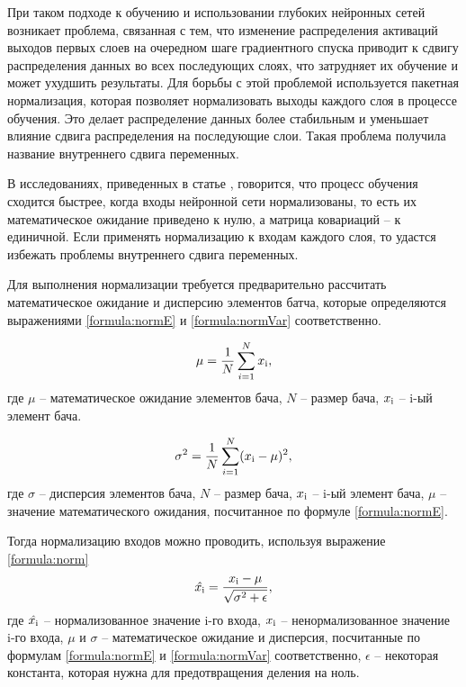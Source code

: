 При таком подходе к обучению и использовании глубоких нейронных сетей возникает проблема, связанная с тем, что изменение распределения активаций выходов первых слоев на очередном шаге градиентного спуска приводит к сдвигу распределения данных во всех последующих слоях, что затрудняет их обучение и может ухудшить результаты. Для борьбы с этой проблемой используется пакетная нормализация, которая позволяет нормализовать выходы каждого слоя в процессе обучения. Это делает распределение данных более стабильным и уменьшает влияние сдвига распределения на последующие слои. Такая проблема получила название внутреннего сдвига переменных.

В исследованиях, приведенных в статье \cite{normalisation_lecun}, говорится, что процесс обучения сходится быстрее, когда входы нейронной сети нормализованы, то есть их математическое ожидание приведено к нулю, а матрица ковариаций -- к единичной. Если применять нормализацию к входам каждого слоя, то удастся избежать проблемы внутреннего сдвига переменных.

Для выполнения нормализации требуется предварительно рассчитать математическое ожидание и дисперсию элементов батча, которые определяются выражениями \ref{formula:normE} и \ref{formula:normVar} соответственно.

\begin{equation}\label{formula:normE}
\mu = \frac{1}{N} \sum\limits_{i=1}^{N}x_{\rm{i}},
\end{equation}
где $\mu$ -- математическое ожидание элементов бача, $N$ -- размер бача, $x_{\rm{i}}$ -- i-ый элемент бача.

\begin{equation}\label{formula:normVar}
\sigma^2 = \frac{1}{N} \sum\limits_{i=1}^{N}(x_{\rm{i}} - \mu)^2,
\end{equation}
где $\sigma$ -- дисперсия элементов бача, $N$ -- размер бача, $x_{\rm{i}}$ -- i-ый элемент бача, $\mu$ -- значение математического ожидания, посчитанное по формуле \ref{formula:normE}.

Тогда нормализацию входов можно проводить, используя выражение \ref{formula:norm}
\begin{equation}\label{formula:norm}
\hat{x_{\rm{i}}} = \frac{x_{\rm{i}} - \mu}{\sqrt{\sigma^2 + \epsilon}},
\end{equation}
где $\hat{x_{\rm{i}}}$ -- нормализованное значение i-го входа, $x_{\rm{i}}$ -- ненормализованное значение i-го входа, $\mu$ и $\sigma$ -- математическое ожидание и дисперсия, посчитанные по формулам \ref{formula:normE} и \ref{formula:normVar} соответственно, $\epsilon$ -- некоторая константа, которая нужна для предотвращения деления на ноль.

